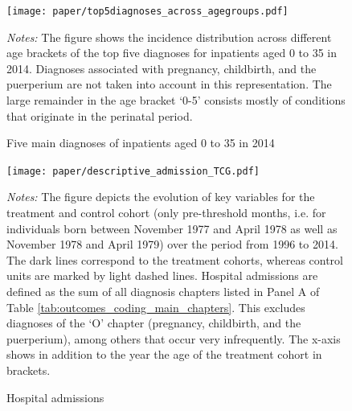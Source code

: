 \documentclass[11pt, a4paper, draft]{article} %
\begin{document}
\vspace*{\fill}
\begin{figure}[H]\centering
	\caption{Five main diagnoses of inpatients aged 0 to 35 in 2014}\label{fig: top5diagnosis_in_2014_across_agegroups}
	\texttt{[image: paper/top5diagnoses\_across\_agegroups.pdf]}
	\begin{minipage}{\linewidth}
		\scriptsize{\emph{Notes:} The figure shows the incidence distribution across different age brackets of the top five diagnoses for inpatients aged 0 to 35 in 2014. Diagnoses associated with pregnancy, childbirth, and the puerperium are not taken into account in this representation. The large remainder in the age bracket `0-5' consists mostly of conditions that originate in the perinatal period.}
	\end{minipage}
\end{figure}
\vspace*{\fill}\clearpage
\newpage
\vspace*{\fill}
\begin{figure}[H]\centering
	\caption{Hospital admissions}\label{fig: descriptive_hospital_admission}
	\texttt{[image: paper/descriptive\_admission\_TCG.pdf]}
	\begin{minipage}{\linewidth}
		\scriptsize{\emph{Notes:} The figure depicts the evolution of key variables for the treatment and control cohort (only pre-threshold months, i.e. for individuals born between November 1977 and April 1978 as well as November 1978 and April 1979) over the period from 1996 to 2014. The dark lines correspond to the treatment cohorts, whereas control units are marked by light dashed lines. Hospital admissions are defined as the sum of all diagnosis chapters listed in Panel A of Table \ref{tab:outcomes_coding_main_chapters}. This excludes diagnoses of the `O' chapter (pregnancy, childbirth, and the puerperium), among others that occur very infrequently. The x-axis shows in addition to the year the age of the treatment cohort in brackets.} 
	\end{minipage}
\end{figure}
\vspace*{\fill}\clearpage
\end{document}
